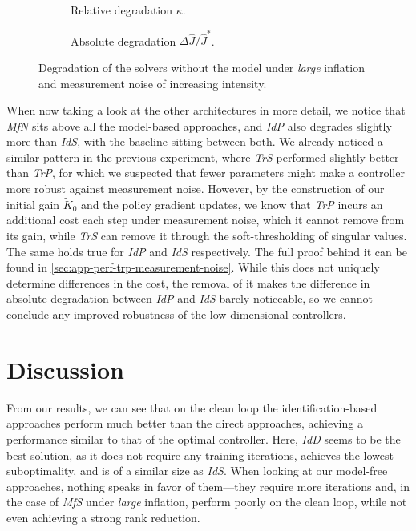 \begin{figure}[htbp]
  \centering
  \begin{subfigure}[t]{0.49\linewidth}
    \centering
    \caption{Relative degradation $\kappa$.}
    \label{fig:noise-large-measurement-relative}
  \end{subfigure}\hfill
  \begin{subfigure}[t]{0.49\linewidth}
    \centering
    \caption{Absolute degradation $\Delta \hat{J} / \hat{J}^{*}$.}
    \label{fig:noise-large-measurement-absolute}
  \end{subfigure}
  \caption{Degradation of the solvers without the model under \emph{large} inflation and measurement noise of
  increasing intensity.}
  \label{fig:noise-large-measurement}
\end{figure}

When now taking a look at the other architectures in more detail, we notice that \emph{MfN} sits above all the model-based approaches,
and \emph{IdP} also degrades slightly more than \emph{IdS}, with the baseline sitting between both. We
already noticed a similar pattern in the previous experiment, where \emph{TrS} performed slightly better
than \emph{TrP}, for which we suspected that fewer parameters might make a controller more robust against measurement noise.
However, by the construction of our initial gain $\tilde{K}_0$ and the policy gradient updates, we know that \emph{TrP} incurs
an additional cost each step under measurement noise, which it cannot remove from its gain, while \emph{TrS} can remove it
through the soft-thresholding of singular values. The same holds true for \emph{IdP} and \emph{IdS} respectively. The
full proof behind it can be found in \cref{sec:app-perf-trp-measurement-noise}. While this does not uniquely determine differences
in the cost, the removal of it makes the difference in absolute degradation between \emph{IdP} and \emph{IdS} barely noticeable,
so we cannot conclude any improved robustness of the low-dimensional controllers.

\section{Discussion}
\label{sec:lqr-discussion}

From our results, we can see that on the clean loop the identification-based approaches perform much better
than the direct approaches, achieving a performance similar to that of the optimal controller. Here, \emph{IdD} seems to
be the best solution, as it does not require any training iterations, achieves the lowest suboptimality,
and is of a similar size as \emph{IdS}. When looking at our model-free approaches, nothing speaks in favor of them---they
require more iterations and, in the case of \emph{MfS} under \emph{large} inflation, perform poorly on the clean loop, while not even
achieving a strong rank reduction.

